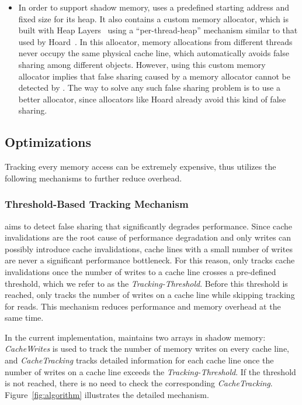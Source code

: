 \begin{itemize}
\item
In order to support shadow memory, \Predator{} uses a predefined starting address and fixed size for its heap.  It also contains a custom memory allocator, which is built with Heap Layers~\cite{heaplayers} using a ``per-thread-heap'' mechanism similar to that used by Hoard~\cite{Hoard}.  In this allocator, memory allocations from different threads never occupy the same physical cache line, which automatically avoids false sharing among different objects.  However, using this custom memory allocator implies that false sharing caused by a memory allocator cannot be detected by \Predator{}. The way to solve any such false sharing problem is to use a better allocator, since allocators like Hoard already avoid this kind of false sharing.

\end{itemize} 
 
\subsection{Optimizations}
\label{optimization}
Tracking every memory access can be extremely expensive, thus 
\Predator{} utilizes the following mechanisms to further reduce overhead.

\subsubsection{Threshold-Based Tracking Mechanism}
\label{sec:thresholdtracking}
\Predator{} aims to detect false sharing that significantly degrades performance. Since cache invalidations are the root cause of performance degradation and only writes 
can possibly introduce cache invalidations, 
cache lines with a small number of writes are never a significant performance bottleneck.
For this reason, \Predator{} only tracks cache invalidations
once the number of writes to a cache line crosses a
pre-defined threshold, which we refer to as the {\it Tracking-Threshold}. 
Before this threshold is reached, \Predator{} only tracks the number of writes on a cache line 
while skipping tracking for reads.
This mechanism reduces performance and memory overhead
at the same time.

In the current implementation, \Predator{} maintains two arrays in shadow memory: 
{\it CacheWrites} is used to track the number of memory writes on every cache line, and
{\it CacheTracking} tracks detailed information 
for each cache line once the number of writes on a cache line exceeds
the {\it Tracking-Threshold}. 
If the threshold is not reached, there is no need to check the corresponding {\it CacheTracking}. 
Figure~\ref{fig:algorithm} illustrates the detailed mechanism.

